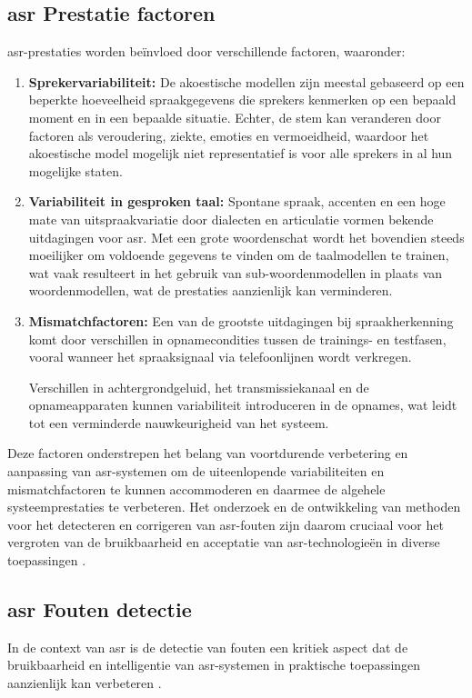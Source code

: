 \subsection{\gls{asr} Prestatie factoren}
\gls{asr}-prestaties worden beïnvloed door verschillende factoren, waaronder:
\begin{enumerate}[label=\arabic*.]
    \item \textbf{Sprekervariabiliteit:}
    De akoestische modellen zijn meestal gebaseerd op een beperkte hoeveelheid spraakgegevens die sprekers kenmerken op een bepaald moment en in een bepaalde situatie. Echter, de stem kan veranderen door factoren als veroudering, ziekte, emoties en vermoeidheid, waardoor het akoestische model mogelijk niet representatief is voor alle sprekers in al hun mogelijke staten.
    
    \item \textbf{Variabiliteit in gesproken taal:}
    Spontane spraak, accenten en een hoge mate van uitspraakvariatie door dialecten en articulatie vormen bekende uitdagingen voor \gls{asr}. Met een grote woordenschat wordt het bovendien steeds moeilijker om voldoende gegevens te vinden om de taalmodellen te trainen, wat vaak resulteert in het gebruik van sub-woordenmodellen in plaats van woordenmodellen, wat de prestaties aanzienlijk kan verminderen.
    
    \item \textbf{Mismatchfactoren:}
    Een van de grootste uitdagingen bij spraakherkenning komt door verschillen in opnamecondities tussen de trainings- en testfasen, vooral wanneer het spraaksignaal via telefoonlijnen wordt verkregen. 
    
    Verschillen in achtergrondgeluid, het transmissiekanaal en de opnameapparaten kunnen variabiliteit introduceren in de opnames, wat leidt tot een verminderde nauwkeurigheid van het systeem.
\end{enumerate} 


Deze factoren onderstrepen het belang van voortdurende verbetering en aanpassing van \gls{asr}-systemen om de uiteenlopende variabiliteiten en mismatchfactoren te kunnen accommoderen en daarmee de algehele systeemprestaties te verbeteren. Het onderzoek en de ontwikkeling van methoden voor het detecteren en corrigeren van \gls{asr}-fouten zijn daarom cruciaal voor het vergroten van de bruikbaarheid en acceptatie van \gls{asr}-technologieën in diverse toepassingen \autocite{Errattahi_2018}.

\subsection{\gls{asr} Fouten detectie}
In de context van \gls{asr} is de detectie van fouten een kritiek aspect dat de bruikbaarheid en intelligentie van \gls{asr}-systemen in praktische toepassingen aanzienlijk kan verbeteren \autocite{jiang2005confidence}.

